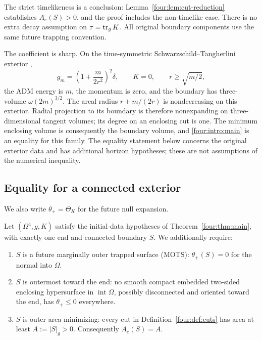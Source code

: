 The strict timelikeness is a conclusion: Lemma~\ref{four:lem:cut-reduction}
establishes \(A_e(S)>0\), and the proof includes the non-timelike case.
There is no extra decay assumption on \(\tau=\operatorname{tr}_gK\).
All original boundary components use the same future trapping convention.

The coefficient is sharp. On the time-symmetric
Schwarzschild--Tangherlini exterior \cite{Tangherlini1963},
\[
 g_m=\left(1+\frac{m}{2r^2}\right)^2\delta,\qquad
 K=0,\qquad r\ge\sqrt{m/2},
\]
the ADM energy is \(m\), the momentum is zero, and the boundary
has three-volume \(\omega(2m)^{3/2}\).
The areal radius \(r+m/(2r)\) is nondecreasing on this exterior.
Radial projection to its boundary is therefore nonexpanding on
three-dimensional tangent volumes; its degree on an enclosing cut is one.
The minimum enclosing volume is consequently the boundary volume,
and \eqref{four:intro:main} is an equality for this family.
The equality statement below concerns the original exterior data and has
additional horizon hypotheses; these are not assumptions of the numerical
inequality.

\subsection{Equality for a connected exterior}

We also write $\theta_+=\Theta_K$ for the future null expansion.

\begin{definition}\label{rig4:def:horizon}
Let \((\Omega^4,g,K)\) satisfy the initial-data hypotheses of
Theorem~\ref{four:thm:main}, with exactly one end
and connected boundary \(S\). We additionally require:
\begin{enumerate}[label=(\roman*),leftmargin=*]
\item \(S\) is a future marginally outer trapped surface (MOTS):
      \(\theta_+(S)=0\) for the normal into \(\Omega\).
\item \(S\) is outermost toward the end: no smooth compact embedded two-sided
      enclosing hypersurface in \(\operatorname{int}\Omega\), possibly
      disconnected and oriented toward the end, has \(\theta_+\le0\)
      everywhere.
\item \(S\) is outer area-minimizing: every cut in Definition~\ref{four:def:cuts}
      has area at least \(A:=|S|_g>0\). Consequently \(A_e(S)=A\).
\end{enumerate}
\end{definition}


